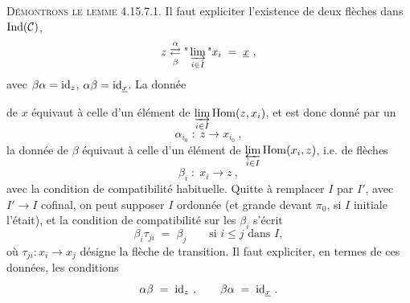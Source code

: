 \textsc{Démontrons le lemme} 4.15.7.1. Il faut expliciter l'existence de deux flèches dans $\operatorname{Ind}(\mathcal{C})$,
\[
z \underset{\beta}{\overset{\alpha}{\rightleftarrows}} \text{"}\varinjlim_{i\in I}\text{"} x_i \;=\; \underline{x}\ ,
\]
avec $\beta\alpha = \mathrm{id}_z$, $\alpha\beta = \mathrm{id}_{\underline{x}}$. La donnée

de $x$ équivaut à celle d'un élément de $\varinjlim\limits_{i\in I} \operatorname{Hom}(z,x_i)$, et est donc donné par un %
\[
\alpha_{i_0} \;:\; z \longrightarrow x_{i_0}\ ,
\]
la donnée de $\beta$ équivaut à celle d'un élément de $\varprojlim\limits_{i\in I} \operatorname{Hom}(x_i,z)$, i.e. de flèches
\[
\beta_i \;:\; x_i \longrightarrow z\ ,
\]
avec la condition de compatibilité habituelle. Quitte à remplacer $I$ par $I'$, avec $I' \longrightarrow I$ cofinal, on peut supposer $I$ ordonnée (et grande devant $\pi_0$, si $I$ initiale l'était), et la condition de compatibilité sur les $\beta_i$ s'écrit
\[
\beta_i\tau_{ji} \;=\; \beta_j \qquad \text{si } i \leqslant j \text{ dans } I,
\]
où $\tau_{ji} : x_i \longrightarrow x_j$ désigne la flèche de transition. Il faut expliciter, en termes de ces données, les conditions
\[
\alpha\beta \;=\; \mathrm{id}_z\ , \qquad \beta\alpha \;=\; \mathrm{id}_{\underline{x}}\ .
\]

